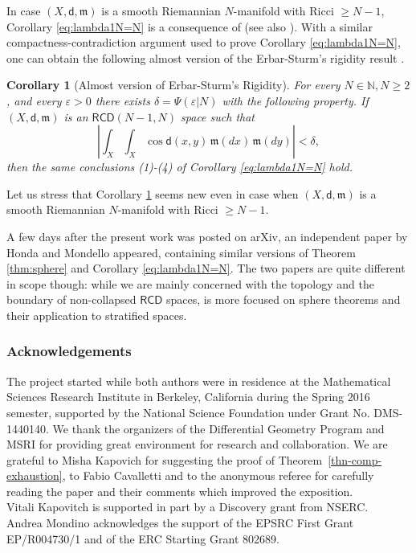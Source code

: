 \documentclass[a4paper]{amsart}
\theoremstyle{plain}
\newtheorem{corollary}[lemma]{Corollary}
\theoremstyle{definition}
\numberwithin{equation}{section}
\newcommand{\N}{\mathbb{N}}
\newcommand{\RCD}{\mathsf{RCD}}
\newcommand{\mm}{\mathfrak m}
\newcommand{\sfd}{\mathsf d}
\begin{document}
{{In case $(X,\sfd,\mm)$ is a smooth Riemannian $N$-manifold with Ricci $\geq N-1$, Corollary \ref{eq:lambda1N=N} is a consequence of \cite[Theorem 1.1]{PetEigenvalue}\cite{Col96b, Col96a} (see also \cite{BertrandEigenvalue}).
With a similar compactness-contradiction argument used to prove Corollary \ref{eq:lambda1N=N}, one can obtain the following almost version of the  Erbar-Sturm's rigidity result  \cite[Corollary 1.4]{ErSt18}. 
 \begin{corollary}[Almost version of Erbar-Sturm's Rigidity]\label{cor:ESAR}
For every  $N\in \N, N\geq 2$, and every  $\varepsilon>0$ there exists $\delta=\Psi(\varepsilon|N)$ with the following property.
If $(X,\sfd,\mm)$ is an $\RCD(N-1,N)$ space such that 
$$\left|\int_{X}\int_{X} \cos \sfd(x,y)\,  \mm(dx) \, \mm(dy) \right|<\delta,$$
 then the same conclusions {\rm (1)-(4)} of Corollary \ref{eq:lambda1N=N} hold.
\end{corollary}
Let us stress that Corollary \ref{cor:ESAR} seems new even in case when $(X,\sfd,\mm)$ is a smooth Riemannian $N$-manifold with Ricci $\geq N-1$.



A few days after the present work was posted on arXiv, an independent paper by Honda and Mondello \cite{HM} appeared, containing  similar versions of  Theorem \ref{thm:sphere} and Corollary \ref{eq:lambda1N=N}.
The two papers are quite different in scope though: while we are mainly concerned with the topology and the boundary of non-collapsed
$\RCD$ spaces,   \cite{HM} is more focused on sphere theorems and their application to stratified spaces. 


\subsubsection*{Acknowledgements}   
The project started  while both authors were in residence at the Mathematical Sciences Research Institute in Berkeley, California during the Spring 2016 semester, supported by the National Science Foundation under Grant No. DMS-1440140. We thank the organizers of the Differential Geometry Program and MSRI for providing great environment for research and collaboration. We are grateful to Misha Kapovich for suggesting  the proof of Theorem~\ref{thn-comp-exhaustion}, { to Fabio Cavalletti and to the anonymous referee for carefully reading the paper and their comments which improved the exposition. }
\\Vitali Kapovitch is supported in part by a Discovery grant from NSERC.
\\Andrea Mondino acknowledges the support of   the EPSRC First Grant  EP/R004730/1 and of the ERC Starting Grant 802689. 

}}
\end{document}
